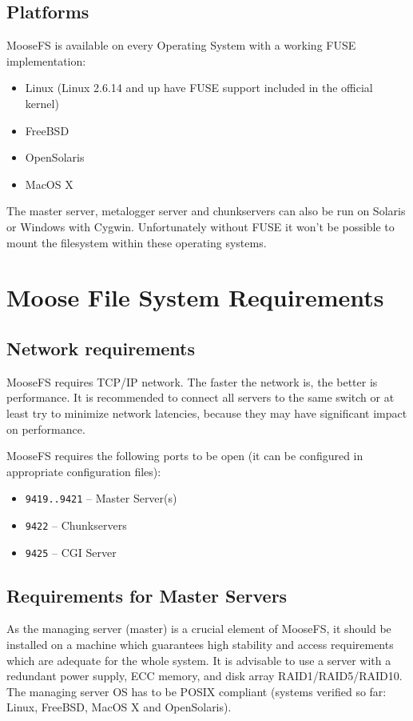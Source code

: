 \documentclass[a4paper,11pt,english]{report}
\def\code#1{\texttt{#1}}
\begin{document}
		\section{Platforms}
		MooseFS is available on every Operating System with a working FUSE implementation:
		\begin{itemize}
			\item Linux (Linux 2.6.14 and up have FUSE support included in the official kernel)
			\item FreeBSD
			\item OpenSolaris
			\item MacOS X
		\end{itemize}
	
		\bigskip	
		The master server, metalogger server and chunkservers can also be run on Solaris or Windows with Cygwin. Unfortunately without FUSE it won't be possible to mount the filesystem within these operating systems.


	\chapter{Moose File System Requirements}

		\section{Network requirements}
		
		MooseFS requires TCP/IP network. The faster the network is, the better is performance. It is recommended to connect all servers to the same switch or at least try to minimize network latencies, because they may have significant impact on performance.
		
		MooseFS requires the following ports to be open (it can be configured in appropriate configuration files):
		
		\begin{itemize}
			\item \code{9419..9421} -- Master Server(s)
			\item \code{9422} -- Chunkservers
			\item \code{9425} -- CGI Server
		\end{itemize}
	
		\section{Requirements for Master Servers}
		As the managing server (master) is a crucial element of MooseFS, it should be installed on a machine which guarantees high stability and access requirements which are adequate for the whole system. It is advisable to use a server with a redundant power supply, ECC memory, and disk array RAID1/RAID5/RAID10. The managing server OS has to be POSIX compliant (systems verified so far: Linux, FreeBSD, MacOS X and OpenSolaris).
\end{document}
